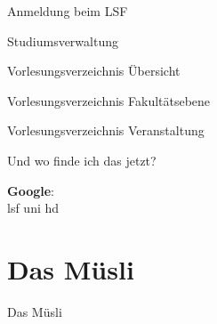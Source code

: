 \begin{frame}{Anmeldung beim LSF}
        \vspace*{-5pt}
\end{frame}

\begin{frame}{Studiumsverwaltung}
        \vspace*{-5pt}
\end{frame}

\begin{frame}{Vorlesungsverzeichnis Übersicht}
        \vspace*{-5pt}
\end{frame}

\begin{frame}{Vorlesungsverzeichnis Fakultätsebene}
        \vspace*{-10pt}
\end{frame}

\begin{frame}{Vorlesungsverzeichnis Veranstaltung}
		\vspace*{-5pt}
\end{frame}

\begin{frame}{Und wo finde ich das jetzt?}
    \begin{center}
        \huge{\textbf{Google}:}\\
        \vspace{1em}
        \huge{\frqq lsf uni hd\flqq}\\
        \vspace{2em}
    \end{center}
\end{frame}

\section{Das Müsli}
\begin{frame}{Das Müsli}
        \vspace*{-50pt}
\end{frame}

